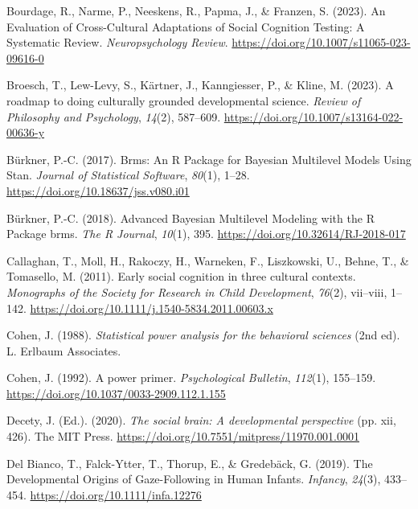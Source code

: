 \documentclass[
  man,floatsintext]{apa7}
\newlength{\cslhangindent}
\newenvironment{CSLReferences}[2] %
 {\begin{list}{}{%
  \setlength{\itemindent}{0pt}
  \setlength{\leftmargin}{0pt}
  \setlength{\parsep}{0pt}
  \ifodd #1
   \setlength{\leftmargin}{\cslhangindent}
   \setlength{\itemindent}{-1\cslhangindent}
  \fi
  \setlength{\itemsep}{#2\baselineskip}}}
 {\end{list}}
\begin{document}
\begin{CSLReferences}{1}{0}
Bourdage, R., Narme, P., Neeskens, R., Papma, J., \& Franzen, S. (2023). An {Evaluation} of {Cross-Cultural Adaptations} of {Social Cognition Testing}: {A Systematic Review}. \emph{Neuropsychology Review}. \url{https://doi.org/10.1007/s11065-023-09616-0}

Broesch, T., Lew-Levy, S., Kärtner, J., Kanngiesser, P., \& Kline, M. (2023). A roadmap to doing culturally grounded developmental science. \emph{Review of Philosophy and Psychology}, \emph{14}(2), 587--609. \url{https://doi.org/10.1007/s13164-022-00636-y}

Bürkner, P.-C. (2017). Brms: {An R Package} for {Bayesian Multilevel Models Using Stan}. \emph{Journal of Statistical Software}, \emph{80}(1), 1--28. \url{https://doi.org/10.18637/jss.v080.i01}

Bürkner, P.-C. (2018). Advanced {Bayesian Multilevel Modeling} with the {R Package} brms. \emph{The R Journal}, \emph{10}(1), 395. \url{https://doi.org/10.32614/RJ-2018-017}

Callaghan, T., Moll, H., Rakoczy, H., Warneken, F., Liszkowski, U., Behne, T., \& Tomasello, M. (2011). Early social cognition in three cultural contexts. \emph{Monographs of the Society for Research in Child Development}, \emph{76}(2), vii--viii, 1--142. \url{https://doi.org/10.1111/j.1540-5834.2011.00603.x}

Cohen, J. (1988). \emph{Statistical power analysis for the behavioral sciences} (2nd ed). L. Erlbaum Associates.

Cohen, J. (1992). A power primer. \emph{Psychological Bulletin}, \emph{112}(1), 155--159. \url{https://doi.org/10.1037/0033-2909.112.1.155}

Decety, J. (Ed.). (2020). \emph{The social brain: {A} developmental perspective} (pp. xii, 426). The MIT Press. \url{https://doi.org/10.7551/mitpress/11970.001.0001}

Del Bianco, T., Falck-Ytter, T., Thorup, E., \& Gredebäck, G. (2019). The {Developmental Origins} of {Gaze-Following} in {Human Infants}. \emph{Infancy}, \emph{24}(3), 433--454. \url{https://doi.org/10.1111/infa.12276}


\end{CSLReferences}
\end{document}
